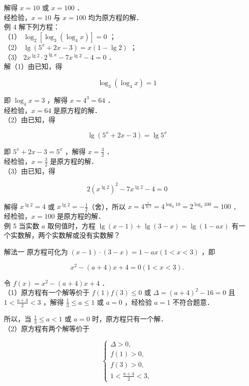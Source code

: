 \documentclass[10pt]{article}
\begin{document}
解得 \(x=10\) 或 \(x=100\) ．\\
经检验，\(x=10\) 与 \(x=100\) 均为原方程的解．\\
例 4 解下列方程：\\
（1） \(\log _{2}\left[\log _{3}\left(\log _{4} x\right)\right]=0\) ；\\
（2） \(\lg \left(5^{x}+2 x-3\right)=x(1-\lg 2)\) ；\\
（3） \(2 x^{\lg 2} \cdot 2^{\lg x}-7 x^{\lg 2}-4=0\) ．\\
解（1）由已知，得

\[
\log _{3}\left(\log _{4} x\right)=1
\]

即 \(\log _{4} x=3\) ，解得 \(x=4^{3}=64\) ．\\
经检验，\(x=64\) 是原方程的解．\\
（2）由已知，得

\[
\lg \left(5^{x}+2 x-3\right)=\lg 5^{x}
\]

即 \(5^{x}+2 x-3=5^{x}\) ，解得 \(x=\frac{3}{2}\) ．\\
经检验，\(x=\frac{3}{2}\) 是原方程的解．\\
（3）由已知，得

\[
2\left(x^{\lg 2}\right)^{2}-7 x^{\lg 2}-4=0
\]

解得 \(x^{\lg 2}=4\) 或 \(x^{\lg 2}=-\frac{1}{2}\)（舍），所以 \(x=4^{\frac{1}{\lg 2}}=4^{\log _{2} 10}=2^{\log _{2} 100}=100\) ．\\
经检验，\(x=100\) 是原方程的解．\\
例 5 当实数 \(a\) 取何值时，方程 \(\lg (x-1)+\lg (3-x)=\lg (1-a x)\) 有一个实数解，两个实数解或没有实数解？

解法一 原方程可化为 \((x-1) \cdot(3-x)=1-a x(1<x<3)\) ，即

\[
x^{2}-(a+4) x+4=0(1<x<3) .
\]

令 \(f(x)=x^{2}-(a+4) x+4\) ．\\
（1）原方程有一个解等价于 \(f(1) f(3) \leqslant 0\) 或 \(\Delta=(a+4)^{2}-16=0\) 且 \(1<\frac{a+4}{2}<3\) ，解得 \(\frac{1}{3} \leqslant a \leqslant 1\) 或 \(a=0\) ，经检验 \(a=1\) 不符合题意．

所以，当 \(\frac{1}{3} \leqslant a<1\) 或 \(a=0\) 时，原方程只有一个解．\\
（2）原方程有两个解等价于

\[
\left\{\begin{array}{l}
\Delta>0, \\
f(1)>0, \\
f(3)>0, \\
1<\frac{a+4}{2}<3,
\end{array}\right.
\]
\end{document}
